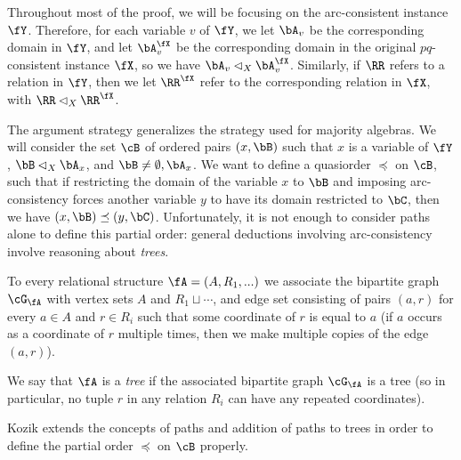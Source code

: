 Throughout most of the proof, we will be focusing on the arc-consistent instance $\fY$. Therefore, for each variable $v$ of $\fY$, we let $\bA_v$ be the corresponding domain in $\fY$, and let $\bA_v^{\fX}$ be the corresponding domain in the original $pq$-consistent instance $\fX$, so we have $\bA_v \lhd_X \bA_v^{\fX}$. Similarly, if $\RR$ refers to a relation in $\fY$, then we let $\RR^{\fX}$ refer to the corresponding relation in $\fX$, with $\RR \lhd_X \RR^{\fX}$.

The argument strategy generalizes the strategy used for majority algebras. We will consider the set $\cB$ of ordered pairs $(x,\bB)$ such that $x$ is a variable of $\fY$, $\bB \lhd_X \bA_x$, and $\bB \ne \emptyset, \bA_x$. We want to define a quasiorder $\preceq$ on $\cB$, such that if restricting the domain of the variable $x$ to $\bB$ and imposing arc-consistency forces another variable $y$ to have its domain restricted to $\bC$, then we have $(x,\bB) \preceq (y,\bC)$. Unfortunately, it is not enough to consider paths alone to define this partial order: general deductions involving arc-consistency involve reasoning about \emph{trees}.

\begin{defn} To every relational structure $\fA = (A, R_1, ...)$ we associate the bipartite graph $\cG_\fA$ with vertex sets $A$ and $R_1 \sqcup \cdots$, and edge set consisting of pairs $(a,r)$ for every $a \in A$ and $r \in R_i$ such that some coordinate of $r$ is equal to $a$ (if $a$ occurs as a coordinate of $r$ multiple times, then we make multiple copies of the edge $(a,r)$).

We say that $\fA$ is a \emph{tree} if the associated bipartite graph $\cG_\fA$ is a tree (so in particular, no tuple $r$ in any relation $R_i$ can have any repeated coordinates).
\end{defn}

Kozik \cite{pq-consistency} extends the concepts of paths and addition of paths to trees in order to define the partial order $\preceq$ on $\cB$ properly.

